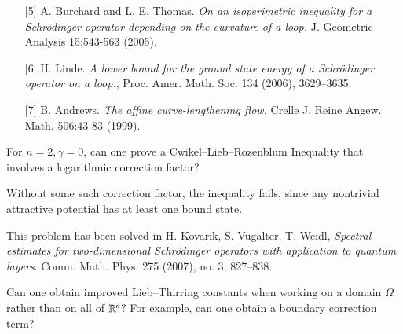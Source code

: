 \documentclass[12pt,letterpaper, reqno]{aimpl}
\begin{document}
\begin{problemblock}
\begin{remark}
\begin{itemize}
\item[{[5]}] A. Burchard and L. E. Thomas. \emph{On an isoperimetric inequality
for a Schr\"odinger operator depending on the curvature of a loop.}
J. Geometric Analysis 15:543-563 (2005).

\item[{[6]}] H. Linde. \emph{A lower bound for the ground state energy of a
Schr\"odinger operator on a loop.},
Proc. Amer. Math. Soc. 134 (2006), 3629--3635.


\item[{[7]}]  B. Andrews. \emph{The affine curve-lengthening flow.}
Crelle J. Reine Angew. Math. 506:43-83 (1999).

\end{itemize}

\end{remark}
\end{problemblock}

\begin{problemblock}


\begin{problem}[2.5]
 For $n=2, \gamma=0$, can one
prove a Cwikel--Lieb--Rozenblum Inequality that involves a
logarithmic correction factor?
\end{problem}

Without some such correction factor,
the inequality fails, since any nontrivial attractive potential has
at least one bound state.

 This problem has been solved in H. Kovarik, S. Vugalter, T. Weidl, \emph{Spectral estimates for two-dimensional Schr\"odinger operators with application to quantum layers}. Comm. Math. Phys. 275 (2007), no. 3, 827--838.

\end{problemblock}


\begin{prob}[2.53]
 Can one obtain improved
Lieb--Thirring constants when working on a domain $\Omega$ rather
than on all of $\mathbb R^n$? For example, can one obtain a boundary
correction term?
\end{prob}
\end{document}
